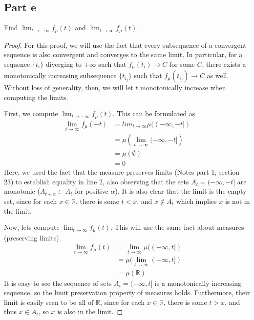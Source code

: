 \documentclass[fontsize=11pt]{scrartcl} %
\numberwithin{equation}{section} %
\numberwithin{figure}{section} %
\numberwithin{table}{section} %
\newcommand{\R}{\mathbb{R}}
\begin{document}
\subsection*{Part e}
Find $\lim_{t\to -\infty}f_{\mu}(t)$ and $\lim_{t\to\infty}f_{\mu}(t)$.
\\
\begin{proof}
For this proof, we will use the fact that every subsequence of a convergent sequence is
also convergent and converges to the same limit. In particular, for a sequence $\{t_i\}$
diverging to $+\infty$ such that $f_{\mu}(t_i)\to C$ for some $C$, there exists
a monotonically increasing subsequence $\{t_{i_j}\}$ such that $f_{\mu}(t_{i_j})\to C$ as
well. Without loss of generality, then, we will let $t$ monotonically increase when 
computing the limits.

First, we compute $\lim_{t\to -\infty}f_{\mu}(t)$. This can be formulated as
\[
\begin{aligned}
\lim_{t\to \infty}f_{\mu}(-t) &= lim_{t\to \infty}\mu((-\infty,-t])\\
        &= \mu\left(\lim_{t\to\infty}(-\infty,-t]\right)\\
        &= \mu(\emptyset)\\
        &= 0
\end{aligned}
\]
Here, we used the fact that the measure preserves limits (Notes part 1, section 23) to
establish equality in line 2, also observing that the sets $A_t = (-\infty,-t]$ are monotonic
($A_{t+\alpha}\subset A_t$ for positive $\alpha$). It is also clear that the limit is 
the empty set, since for each $x\in\R$, there is some $t<x$, and $x\not\in A_t$ which
implies $x$ is not in the limit.

Now, lets compute $\lim_{t\to\infty}f_{\mu}(t)$. This will use the same fact about measures
(preserving limits).
\[
\begin{aligned}
\lim_{t\to\infty}f_{\mu}(t) &= \lim_{t\to\infty}\mu((-\infty, t])\\
        &= \mu(\lim_{t\to\infty}(-\infty,t])\\
        &= \mu(\R)
\end{aligned}
\]
It is easy to see the sequence of sets $A_t = (-\infty,t]$ is a monotonically increasing
sequence, so the limit preservation property of measures holds. Furthermore, their limit
is easily seen to be all of $\R$, since for each $x\in\R$, there is some $t>x$, and thus
$x\in A_t$, so $x$ is also in the limit.
\end{proof}
\end{document}
